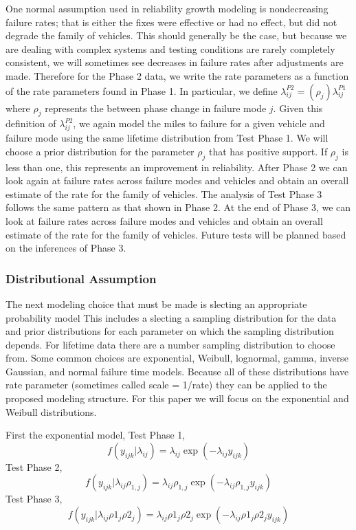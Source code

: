\documentclass[12pt]{article}
\begin{document}
One normal assumption used in reliability growth modeling is nondecreasing
failure rates; that is either the fixes were effective or had no effect, but did
not degrade the family of vehicles.  This should generally be the case, but
because we are dealing with complex systems and testing conditions are rarely
completely consistent, we will sometimes see decreases in failure rates after
adjustments are made.  Therefore for the Phase 2 data, we write the rate
parameters as a function of the rate parameters found in Phase 1. In particular,
we define $\lambda_{ij}^{P2}=(\rho_{j})\lambda_{ij}^{P1}$ where $\rho_{j}$
represents the between phase change in failure mode $j$. Given this definition
of $\lambda_{ij}^{P2}$, we again model the miles to failure for a given vehicle
and failure mode using the same lifetime distribution from Test Phase 1.  We
will choose a prior distribution for the parameter $\rho_{j}$ that has positive
support.  If $\rho_{j}$ is less than one, this represents an improvement in
reliability.  After Phase 2 we can look again at failure rates across failure
modes and vehicles and obtain an overall estimate of the rate for the family of
vehicles.  The analysis of Test Phase 3 follows the same pattern as that shown
in Phase 2. At the end of Phase 3, we can look at failure rates across failure
modes and vehicles and obtain an overall estimate of the rate for the family of
vehicles. Future tests will be planned based on the inferences of Phase 3.

\subsubsection{Distributional Assumption}
The next modeling choice that must be made is slecting an appropriate
probability model This includes a slecting a sampling distribution for the data
and prior distributions for each parameter on which the sampling distribution
depends.  For lifetime data there are a number sampling distribution to choose
from.  Some common choices are exponential, Weibull, lognormal, gamma, inverse
Gaussian, and normal failure time models.  Because all of these distributions
have rate parameter (sometimes called scale = 1/rate) they can be applied to
the proposed modeling structure.  For this paper we will focus on the
exponential and Weibull distributions.

First the exponential model, Test Phase 1,
\begin{equation} f(y_{ijk}|\lambda_{ij})=\lambda_{ij} \exp(-\lambda_{ij}
y_{ijk})
\end{equation}
Test Phase 2,
\begin{equation}
f(y_{ijk}|\lambda_{ij}\rho_{1,j})=\lambda_{ij}\rho_{1,j}
\exp(-\lambda_{ij}\rho_{1,j} y_{ijk})
\end{equation}
Test Phase 3,
\begin{equation}
f(y_{ijk}|\lambda_{ij}\rho1_{j}\rho2_{j})=\lambda_{ij}\rho1_{j}\rho2_{j}
\exp(-\lambda_{ij}\rho1_{j}\rho2_{j} y_{ijk})
\end{equation}
\end{document}
